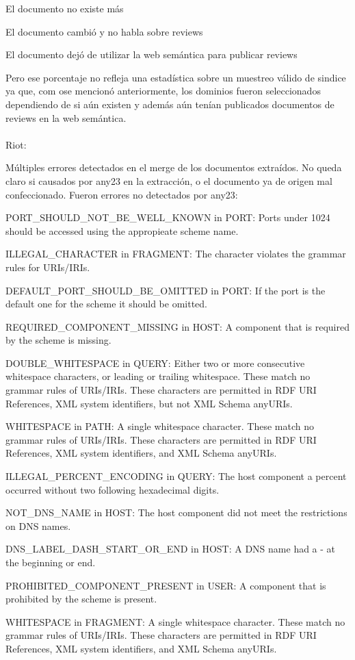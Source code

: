 El documento no existe más

El documento cambió y no habla sobre reviews

El documento dejó de utilizar la web semántica para publicar reviews

Pero ese porcentaje no refleja una estadística sobre un muestreo válido de sindice ya que, com ose mencionó anteriormente, los dominios fueron seleccionados 
dependiendo de si aún existen y además aún tenían publicados documentos de reviews en la web semántica.
\\
\\
Riot:

Múltiples errores detectados en el merge de los documentos extraídos. No queda claro si causados por any23 en la extracción, o el documento ya de origen 
mal confeccionado. Fueron errores  no detectados por any23:

PORT\_SHOULD\_NOT\_BE\_WELL\_KNOWN in PORT: Ports under 1024 should be accessed using the appropieate scheme name. 

ILLEGAL\_CHARACTER in FRAGMENT: The character violates the grammar rules for URIs/IRIs.

DEFAULT\_PORT\_SHOULD\_BE\_OMITTED in PORT: If the port is the default one for the scheme it should be omitted. 

REQUIRED\_COMPONENT\_MISSING in HOST: A component that is required by the scheme is missing.

DOUBLE\_WHITESPACE in QUERY: Either two or more consecutive whitespace characters, or leading or trailing whitespace. These match no grammar rules of URIs/IRIs. These characters are permitted in RDF URI References, XML system identifiers, but not XML Schema anyURIs.

WHITESPACE in PATH: A single whitespace character. These match no grammar rules of URIs/IRIs. These characters are permitted in RDF URI References, XML system identifiers, and XML Schema anyURIs.

ILLEGAL\_PERCENT\_ENCODING in QUERY: The host component a percent occurred without two following hexadecimal digits.

NOT\_DNS\_NAME in HOST: The host component did not meet the restrictions on DNS names.

DNS\_LABEL\_DASH\_START\_OR\_END in HOST: A DNS name had a - at the beginning or end.

PROHIBITED\_COMPONENT\_PRESENT in USER: A component that is prohibited by the scheme is present.

WHITESPACE in FRAGMENT: A single whitespace character. These match no grammar rules of URIs/IRIs. These characters are permitted in RDF URI References, XML system identifiers, and XML Schema anyURIs.

